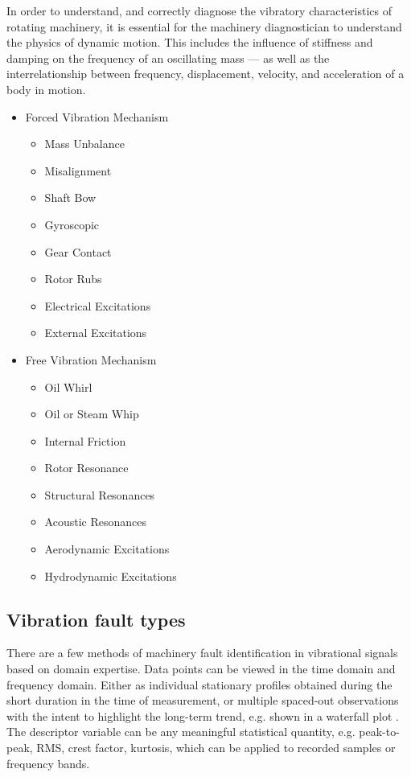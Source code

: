 In order to understand, and correctly diagnose the vibratory characteristics of rotating machinery, it is essential for the machinery diagnostician to understand the physics of dynamic motion. This includes the influence of stiffness and damping on the frequency of an oscillating mass — as well as the interrelationship between frequency, displacement, velocity, and acceleration of a body in motion. \cite{eisenmann_machinery_1997}
\begin{itemize}
\item Forced Vibration Mechanism
	\begin{itemize}
	\item Mass Unbalance
	\item Misalignment
	\item 	Shaft Bow
	\item Gyroscopic
	\item Gear Contact
	\item Rotor Rubs
	\item Electrical Excitations
	\item External Excitations
	\end{itemize}
\item Free Vibration Mechanism
	\begin{itemize}
	\item Oil Whirl
	\item Oil or Steam Whip
	\item  Internal Friction
	\item Rotor Resonance
	\item Structural Resonances
	\item Acoustic Resonances
	\item Aerodynamic Excitations
	\item Hydrodynamic Excitations
	\end{itemize}
\end{itemize}

\subsection{Vibration fault types}
There are a few methods of machinery fault identification in vibrational signals based on domain expertise. Data points can be viewed in the time domain and frequency domain. Either as individual stationary profiles obtained during the short duration in the time of measurement, or multiple spaced-out observations with the intent to highlight the long-term trend, e.g. shown in a waterfall plot \cite{ziaran_technicka_2013}. The descriptor variable can be any meaningful statistical quantity, e.g. peak-to-peak, RMS, crest factor, kurtosis, which can be applied to recorded samples or frequency bands.

